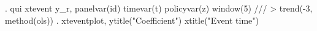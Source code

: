 . qui xtevent y_r, panelvar(id) timevar(t) policyvar(z) window(5) ///
>         trend(-3, method(ols))
{\smallskip}
. xteventplot, ytitle("Coefficient") xtitle("Event time")
